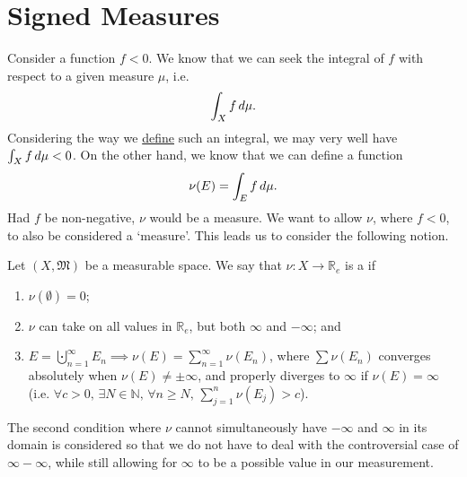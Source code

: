 \documentclass[notoc,notitlepage]{tufte-book}
\begin{document}

\section{Signed Measures}%
\label{sec:signed_measures}

Consider a function $f < 0$. We know that we can seek the
integral of $f$ with respect to a given measure $\mu$,
i.e.
\begin{equation*}
  \int_{X} f \mathop{}\!d{\mu}.
\end{equation*}
Considering the way we \hyperref[defn:integral_of_a_measurable_function]{define}
such an integral, we may very well have $\int_{X} f \mathop{}\!d{\mu} < 0$.
On the other hand, we know that we can define a function
\begin{equation*}
  \nu(E) = \int_{E} f \mathop{}\!d{\mu}.
\end{equation*}
Had $f$ be non-negative, $\nu$ would be a measure.
We want to allow $\nu$, where $f < 0$, to also be considered a `measure'.
This leads us to consider the following notion.

\begin{defn}\label{defn:signed_measure}
  Let $(X, \mathfrak{M})$ be a measurable space.
  We say that $\nu : X \to \mathbb{R}_e$ is a 
  if
  \begin{enumerate}
    \item $\nu(\emptyset) = 0$;
    \item $\nu$ can take on all values in $\mathbb{R}_e$,
      but  both $\infty$ and $-\infty$; and
    \item $E = \bigcupdot_{n=1}^{\infty} E_n \implies \nu(E) =
      \sum_{n=1}^{\infty} \nu(E_n)$,
      where $\sum \nu(E_n)$ converges absolutely when
      $\nu(E) \neq \pm \infty$,
      and properly diverges to $\infty$ if $\nu(E) = \infty$
      (i.e. $\forall c > 0,\, \exists N \in \mathbb{N},\, \forall n \geq
      N,\, \sum_{j=1}^{n} \nu(E_j) > c$).
  \end{enumerate}
\end{defn}

\begin{remark}
  The second condition where $\nu$ cannot simultaneously have $-\infty$
  and $\infty$ in its domain is considered so that we do not have
  to deal with the controversial case of $\infty - \infty$,
  while still allowing for $\infty$ to be a possible value
  in our measurement.
\end{remark}
\end{document}
